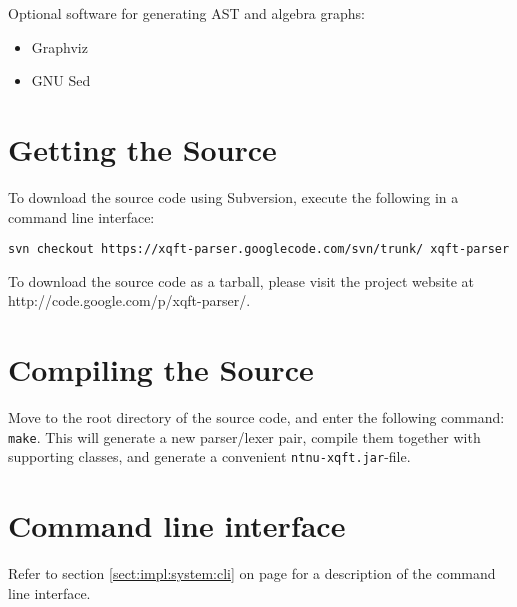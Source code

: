 Optional software for generating AST and algebra graphs:
\begin{itemize}
  \item Graphviz
  \item GNU Sed
\end{itemize}

\section*{Getting the Source}
To download the source code using Subversion, execute the following in a
command line interface:

\verb!svn checkout https://xqft-parser.googlecode.com/svn/trunk/ xqft-parser!

To download the source code as a tarball, please visit the project website at
http://code.google.com/p/xqft-parser/.

\section*{Compiling the Source}
Move to the root directory of the source code, and enter the following command:
\verb!make!. This will generate a new parser/lexer pair, compile them together
with supporting classes, and generate a convenient \verb!ntnu-xqft.jar!-file.

\section*{Command line interface}
Refer to section \ref{sect:impl:system:cli} on page
\pageref{sect:impl:system:cli} for a description of the command line interface.
